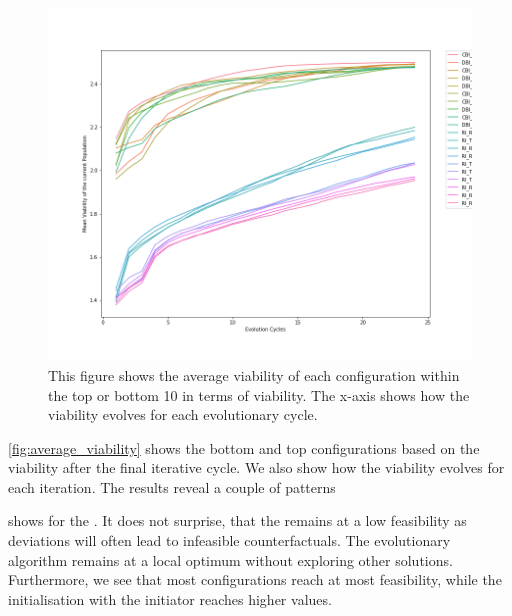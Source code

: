 \documentclass[./../../paper.tex]{subfiles}
\begin{document}
\begin{figure}[htbp]
    \centering
    \includegraphics[width=\textwidth]{figures/generated/exp1_effect_on_viability_top10_last10.png}
    \caption{This figure shows the average viability of each configuration within the top or bottom 10  in terms of viability. The x-axis shows how the viability evolves for each evolutionary cycle.}
    \label{fig:average_viability}
\end{figure}

\noindent \autoref{fig:average_viability} shows the bottom and top  configurations based on the viability after the final iterative cycle. We also show how the viability evolves for each iteration. The results reveal a couple of patterns 


\noindent  shows for the . It does not surprise, that the  remains at a low feasibility as deviations will often lead to infeasible counterfactuals. The evolutionary algorithm remains at a local optimum without exploring other solutions. Furthermore, we see that most configurations reach at most  feasibility, while the initialisation with the  initiator reaches higher values. 
\end{document}
